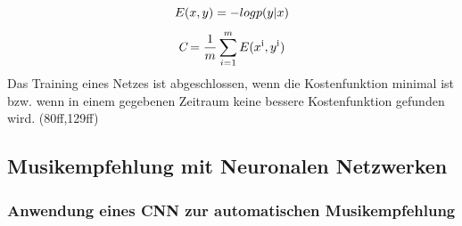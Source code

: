 \documentclass[twosided,a4,10pt]{article}
\begin{document}
\begin{multicols}{2}
		\begin{equation*}
			\centering
			E(x,y) = -log p(y|x)
		\end{equation*}
		\begin{equation*}
			\centering
			\textit{C} = \frac{1}{m}\sum_{i=1}^{m}E(x\textsuperscript{i},y\textsuperscript{i})
		\end{equation*}
		Das Training eines Netzes ist abgeschlossen, wenn die Kostenfunktion minimal ist bzw. wenn in einem gegebenen Zeitraum keine bessere Kostenfunktion gefunden wird. \cite{goodfellow}(80ff,129ff)
		
		\subsection{Musikempfehlung mit Neuronalen Netzwerken}
		
		\subsubsection*{Anwendung eines CNN zur automatischen Musikempfehlung}

\end{multicols}
\end{document}
